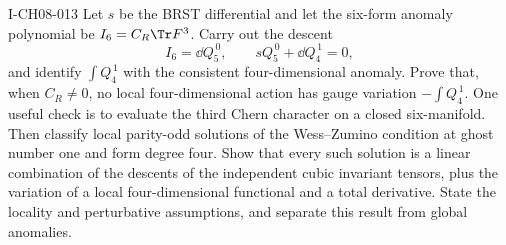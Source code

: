 \begin{exercise}{I-CH08-013}
Let $s$ be the BRST differential and let the six-form anomaly polynomial be
$I_6=C_R\Tr F^3$.  Carry out the descent
\[
 I_6=\dd Q_5^{\,0},\qquad
 sQ_5^{\,0}+\dd Q_4^{\,1}=0,
\]
and identify $\int Q_4^{\,1}$ with the consistent four-dimensional anomaly.
Prove that, when $C_R\ne0$, no local four-dimensional action has gauge
variation $-\int Q_4^{\,1}$.  One useful check is to evaluate the third Chern
character on a closed six-manifold.  Then classify local parity-odd solutions
of the Wess--Zumino condition at ghost number one and form degree four.  Show
that every such solution is a linear combination of the descents of the
independent cubic invariant tensors, plus the variation of a local
four-dimensional functional and a total derivative.  State the locality and
perturbative assumptions, and separate this result from global anomalies.
\end{exercise}
